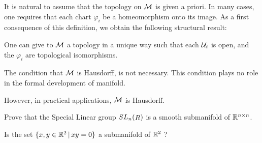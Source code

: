 It is natural to assume that the topology on $\mathcal{M}$ is given a priori. In many cases, one requires that each chart $\varphi_i$ be a homeomorphism onto its image. As a first consequence of this definition, we obtain the following structural result:
\begin{proposition} One can give to $\mathcal{M}$ a topology in a unique way such that each
$\mathcal{U}_i$ is open, and the $\varphi_i$ are topological isomorphisms.
\end{proposition}










\begin{remark}
The condition that $\mathcal{M}$ is  Hausdorff,  is not necessary.
This condition plays no role in the formal development of manifold.  

However, in practical applications,  $\mathcal{M}$ is Hausdorff.
\end{remark}
\begin{ex}\label{Ex:smfd}
    Prove that the Special Linear group $SL_n(\mathop{R})$ is a smooth submanifold of $\mathbb{R}^{n\times n}$.
\end{ex}
\begin{ex}\label{Ex:sing}
Is the set $\{{x,y}\in \mathbb{R}^2\, |\, xy=0\}$ a submanifold of $\mathbb{R}^2$ ?
\end{ex}

